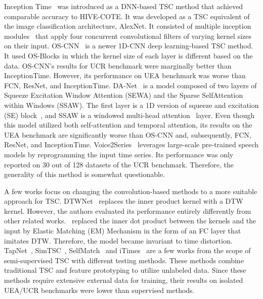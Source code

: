 \documentclass[journal]{IEEEtran}
\begin{document}
Inception Time~\cite{fawaz2020inceptiontime} was introduced as a DNN-based TSC method that achieved comparable accuracy to HIVE-COTE. It was developed as a TSC equivalent of the image classification architecture, AlexNet. It consisted of multiple inception modules~\cite{szegedy2015going} that apply four concurrent convolutional filters of varying kernel sizes on their input. OS-CNN~\cite{tang_omni-scale_2022} is a newer 1D-CNN deep learning-based TSC method. It used OS-Blocks in which the kernel size of each layer is different based on the data. OS-CNN’s results for UCR benchmark were marginally better than InceptionTime. However, its performance on UEA benchmark was worse than FCN, ResNet, and InceptionTime. DA-Net~\cite{chen_da-net_2022} is a model composed of two layers of Squeeze Excitation Window Attention (SEWA) and the Sparse SelfAttention within Windows (SSAW). The first layer is a 1D version of squeeze and excitation (SE) block~\cite{hu2018squeeze}, and SSAW is a windowed multi-head attention~\cite{liu2021swin} layer. Even though this model utilized both self-attention and temporal attention, its results on the UEA benchmark are significantly worse than OS-CNN and, subsequently, FCN, ResNet, and InceptionTime. Voice2Series~\cite {yang_voice2series_2021} leverages large-scale pre-trained speech models by reprogramming the input time series. Its performance was only reported on 30 out of 128 datasets of the UCR benchmark. Therefore, the generality of this method is somewhat questionable.

A few works focus on changing the convolution-based methods to a more suitable approach for TSC. DTWNet~\cite{cai_dtwnet_2019} replaces the inner product kernel with a DTW kernel. However, the authors evaluated its performance entirely differently from other related works.~\cite{ouyang_convolutional_2021} replaced the inner dot product between the kernels and the input by Elastic Matching (EM) Mechanism in the form of an FC layer that imitates DTW. Therefore, the model became invariant to time distortion.\\

TapNet~\cite{tapnet}, SimTSC~\cite{noauthor_towards_nodate}, SelfMatch~\cite{xing_selfmatch_nodate} and iTimes~\cite{liu_itimes_2022} are a few works from the scope of semi-supervised TSC with different testing methods. These methods combine traditional TSC and feature prototyping to utilize unlabeled data. Since these methods require extensive external data for training, their results on isolated UEA/UCR benchmarks were lower than supervised methods.\\
\end{document}
